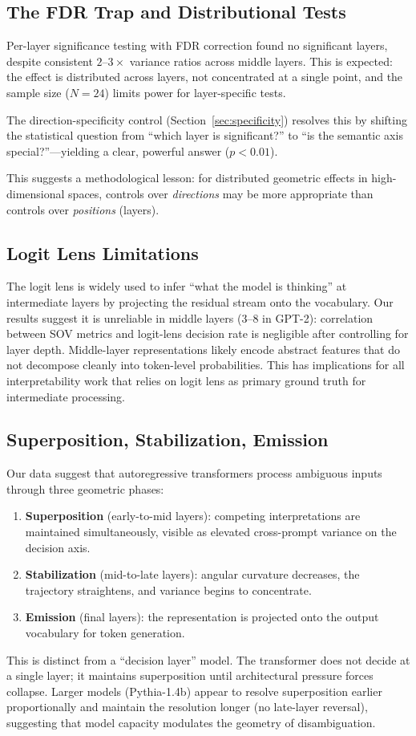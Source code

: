 \documentclass[11pt,a4paper]{article}
\begin{document}
\subsection{The FDR Trap and Distributional Tests}
Per-layer significance testing with FDR correction found no significant layers, despite consistent $2$--$3\times$ variance ratios across middle layers. This is expected: the effect is distributed across layers, not concentrated at a single point, and the sample size ($N = 24$) limits power for layer-specific tests.

The direction-specificity control (Section~\ref{sec:specificity}) resolves this by shifting the statistical question from ``which layer is significant?'' to ``is the semantic axis special?''---yielding a clear, powerful answer ($p < 0.01$).

This suggests a methodological lesson: for distributed geometric effects in high-dimensional spaces, controls over \emph{directions} may be more appropriate than controls over \emph{positions} (layers).

\subsection{Logit Lens Limitations}
The logit lens is widely used to infer ``what the model is thinking'' at intermediate layers by projecting the residual stream onto the vocabulary. Our results suggest it is unreliable in middle layers (3--8 in GPT-2): correlation between SOV metrics and logit-lens decision rate is negligible after controlling for layer depth. Middle-layer representations likely encode abstract features that do not decompose cleanly into token-level probabilities. This has implications for all interpretability work that relies on logit lens as primary ground truth for intermediate processing.

\subsection{Superposition, Stabilization, Emission}
Our data suggest that autoregressive transformers process ambiguous inputs through three geometric phases:
\begin{enumerate}
\item \textbf{Superposition} (early-to-mid layers): competing interpretations are maintained simultaneously, visible as elevated cross-prompt variance on the decision axis.
\item \textbf{Stabilization} (mid-to-late layers): angular curvature decreases, the trajectory straightens, and variance begins to concentrate.
\item \textbf{Emission} (final layers): the representation is projected onto the output vocabulary for token generation.
\end{enumerate}
This is distinct from a ``decision layer'' model. The transformer does not decide at a single layer; it maintains superposition until architectural pressure forces collapse. Larger models (Pythia-1.4b) appear to resolve superposition earlier proportionally and maintain the resolution longer (no late-layer reversal), suggesting that model capacity modulates the geometry of disambiguation.
\end{document}
